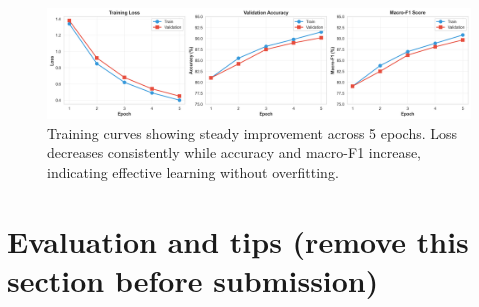 \documentclass[twocolumn,10pt]{article}
\begin{document}
\begin{figure}[h]
\centering
\includegraphics[width=\columnwidth]{../results/figures/training_curves.png}
\caption{Training curves showing steady improvement across 5 epochs. Loss decreases consistently while accuracy and macro-F1 increase, indicating effective learning without overfitting.}
\label{fig:curves}
\end{figure}

\section{Evaluation and tips (remove this section before submission)}
\end{document}
